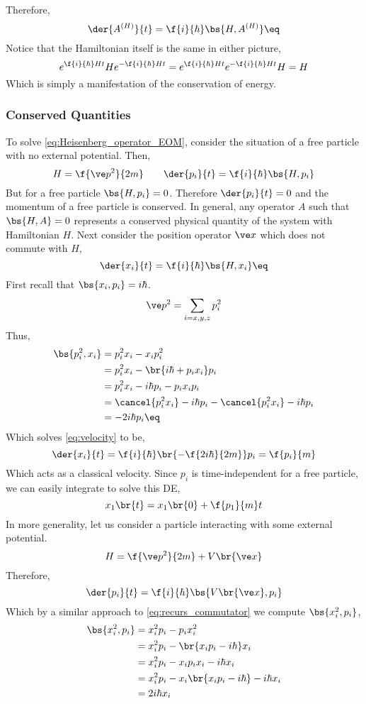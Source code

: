\documentclass{article}
\begin{document}
Therefore,
\[ \der{A^{(H)}}{t} = \f{i}{\hbar} \bs{H, A^{(H)}} \eq \label{eq:Heisenberg_operator_EOM}\]
Notice that the Hamiltonian itself is the same in either picture,
\[ e^{\f{i}{\hbar} Ht} H e^{-\f{i}{\hbar} Ht} = e^{\f{i}{\hbar} Ht} e^{-\f{i}{\hbar} Ht} H = H \]
Which is simply a manifestation of the conservation of energy.\\

\subsubsection{Conserved Quantities}
To solve \cref{eq:Heisenberg_operator_EOM}, consider the situation of a free particle with no external potential. Then,
\[ H = \f{\ve p^2}{2m} \qquad \der{p_i}{t} = \f{i}{\hbar} \bs{H, p_i} \]
But for a free particle $\bs{H, p_i} =0$. Therefore $\der{p_i}{t} = 0$ and the momentum of a free particle is conserved. In general, any operator $A$ such that $\bs{H, A} = 0$ represents a conserved physical quantity of the system with Hamiltonian $H$. Next consider the position operator $\ve x$ which does not commute with $H$,
\[ \der{x_i}{t} = \f{i}{\hbar} \bs{H, x_i} \eq \label{eq:velocity} \]
First recall that $\bs{x_i, p_i} = i\hbar$.
\[ \ve p^2 = \sum_{i = x,y,z} p_i^2 \]
Thus,
\begin{align*}
    \bs{p_i^2, x_i} &= p_i^2 x_i - x_i p_i^2 \\
    &= p_i^2 x_i -\br{i \hbar + p_i x_i}p_i \\
    &= p_i^2 x_i - i \hbar p_i - p_i x_i p_i \\
    &= \cancel{p_i^2 x_i} - i \hbar p_i - \cancel{p_i^2 x_i} - i \hbar p_i  \\
    &= - 2i \hbar p_i \eq \label{eq:recurs_commutator}
\end{align*}
Which solves \cref{eq:velocity} to be,
\[ \der{x_i}{t} = \f{i}{\hbar}\br{-\f{2 i \hbar}{2m}} p_i = \f{p_i}{m} \]
Which acts as a classical velocity. Since $p_i$ is time-independent for a free particle, we can easily integrate to solve this DE,
\[ x_1\br{t} = x_1\br{0} + \f{p_1}{m}t \]
In more generality, let us consider a particle interacting with some external potential.
\[ H = \f{\ve p^2}{2m} + V\br{\ve x} \]
Therefore,
\[ \der{p_i}{t} = \f{i}{\hbar} \bs{V\br{\ve x}, p_i} \]
Which by a similar approach to \cref{eq:recurs_commutator} we compute $\bs{x_i^2, p_i}$,
\begin{align*}
    \bs{x_i^2, p_i} &= x_i^2 p_i - p_i x_i^2 \\
    &= x_i^2 p_i - \br{x_ip_i - i\hbar}x_i \\
    &= x_i^2 p_i - x_ip_ix_i - i\hbar x_i \\
    &= x_i^2 p_i - x_i\br{x_i p_i - i \hbar} - i\hbar x_i \\
    &= 2i \hbar x_i
\end{align*}
\end{document}
